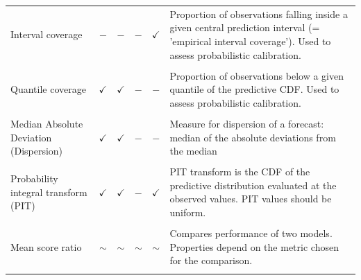 \documentclass[
]{jss}
\begin{document}
\begin{CodeChunk}
\begin{longtable}[t]{>{\raggedright\arraybackslash}p{2.9cm}cccc>{\raggedright\arraybackslash}p{9.3cm}}
Interval coverage & $-$ & $-$ & $-$ & $\checkmark$ & Proportion of observations falling inside a given central prediction interval (= 'empirical interval coverage'). Used to assess probabilistic calibration.\\
\addlinespace
\cellcolor{gray!6}{Coverage deviation} & \cellcolor{gray!6}{$-$} & \cellcolor{gray!6}{$-$} & \cellcolor{gray!6}{$-$} & \cellcolor{gray!6}{$\checkmark$} & \cellcolor{gray!6}{Average difference between empirical and nominal interval coverage (coverage that should have been realised)}\\
\addlinespace
Quantile coverage & $\checkmark$ & $\checkmark$ & $-$ & $-$ & Proportion of observations below a given quantile of the predictive CDF. Used to assess probabilistic calibration.\\
\addlinespace
\cellcolor{gray!6}{Dispersion} & \cellcolor{gray!6}{$-$} & \cellcolor{gray!6}{$-$} & \cellcolor{gray!6}{$-$} & \cellcolor{gray!6}{$\checkmark$} & \cellcolor{gray!6}{Dispersion component of WIS, measures width of predictive intervals.}\\
\addlinespace
Median Absolute Deviation (Dispersion) & $\checkmark$ & $\checkmark$ & $-$ & $-$ & Measure for dispersion of a forecast: median of the absolute deviations from the median\\
\addlinespace
\cellcolor{gray!6}{Under$-$, Over$-$prediction} & \cellcolor{gray!6}{$-$} & \cellcolor{gray!6}{$-$} & \cellcolor{gray!6}{$-$} & \cellcolor{gray!6}{$\checkmark$} & \cellcolor{gray!6}{Absolute amount of over$-$or under$-$prediction (components of WIS)}\\
\addlinespace
Probability integral transform (PIT) & $\checkmark$ & $\checkmark$ & $-$ & $\checkmark$ & PIT transform is the CDF of the predictive distribution evaluated at the observed values. PIT values should be uniform.\\
\addlinespace
\cellcolor{gray!6}{Bias} & \cellcolor{gray!6}{$\checkmark$} & \cellcolor{gray!6}{$\checkmark$} & \cellcolor{gray!6}{$-$} & \cellcolor{gray!6}{$\checkmark$} & \cellcolor{gray!6}{Measure of relative tendency to over$-$ or under$-$predict (aspect of calibration), bounded between $-$1 and 1 (ideally 0)}\\
\addlinespace
Mean score ratio & $\sim$ & $\sim$ & $\sim$ & $\sim$ & Compares performance of two models. Properties depend on the metric chosen for the comparison.\\
\addlinespace
\cellcolor{gray!6}{(Scaled) Relative skill} & \cellcolor{gray!6}{$\sim$} & \cellcolor{gray!6}{$\sim$} & \cellcolor{gray!6}{$\sim$} & \cellcolor{gray!6}{$\sim$} & \cellcolor{gray!6}{Ranks models based on pairwise comparisons, useful in the context of missing forecasts. Properties depend on the metric chosen for the comparison.}\\

\end{longtable}
\end{CodeChunk}
\end{document}
